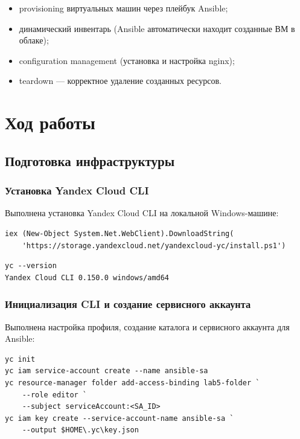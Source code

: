\documentclass[12pt,a4paper]{article}
\begin{document}
\begin{itemize}
    \item provisioning виртуальных машин через плейбук Ansible;
    \item динамический инвентарь (Ansible автоматически находит созданные ВМ в облаке);
    \item configuration management (установка и настройка nginx);
    \item teardown — корректное удаление созданных ресурсов.
\end{itemize}

\section{Ход работы}

\subsection{Подготовка инфраструктуры}

\subsubsection{Установка Yandex Cloud CLI}

Выполнена установка Yandex Cloud CLI на локальной Windows-машине:

\begin{lstlisting}
iex (New-Object System.Net.WebClient).DownloadString(
    'https://storage.yandexcloud.net/yandexcloud-yc/install.ps1')
\end{lstlisting}

\begin{lstlisting}
yc --version
Yandex Cloud CLI 0.150.0 windows/amd64
\end{lstlisting}

\subsubsection{Инициализация CLI и создание сервисного аккаунта}

Выполнена настройка профиля, создание каталога и сервисного аккаунта для Ansible:

\begin{lstlisting}
yc init
yc iam service-account create --name ansible-sa
yc resource-manager folder add-access-binding lab5-folder `
    --role editor `
    --subject serviceAccount:<SA_ID>
yc iam key create --service-account-name ansible-sa `
    --output $HOME\.yc\key.json
\end{lstlisting}
\end{document}
